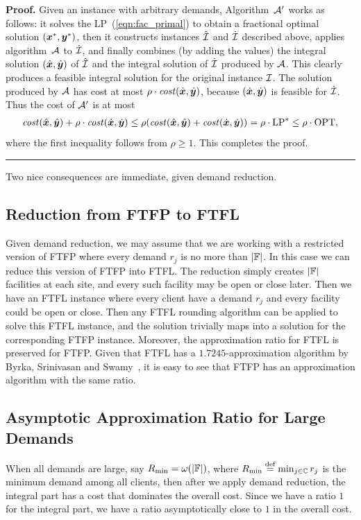 \documentclass[oneside,final]{ucr}
\newenvironment{proof}[1][Proof]{\textbf{#1.} }{\ \rule{0.5em}{0.5em}}
\begin{document}

\begin{proof}
  Given an {\FTFP} instance with arbitrary demands, Algorithm~$\calA'$ works
as follows: it solves the LP~(\ref{eqn:fac_primal}) to obtain a
  fractional optimal solution $(\boldsymbol{x}^\ast,\boldsymbol{y}^\ast)$, then it constructs
  instances $\hatcalI$ and $\dotcalI$ described above,  applies
  algorithm~$\calA$ to $\dotcalI$, and finally combines (by adding
  the values) the integral solution $(\hat{\boldsymbol{x}}, \hat{\boldsymbol{y}})$ of
  $\hatcalI$ and the integral solution of $\dotcalI$ produced
  by $\calA$. This clearly produces a feasible integral
  solution for the original instance $\mathcal{I}$.
The solution produced by $\calA$ has cost at most
$\rho\cdot{\it cost}(\dot{\boldsymbol{x}},\dot{\boldsymbol{y}})$, because $(\dot{\boldsymbol{x}},\dot{\boldsymbol{y}})$
is feasible for $\dotcalI$. Thus the cost of $\calA'$ is at most
% 
 \begin{align*}
 {\it cost}(\hat{\boldsymbol{x}}, \hat{\boldsymbol{y}}) + \rho\cdot{\it cost}(\dot{\boldsymbol{x}},\dot{\boldsymbol{y}})
	\le
 \rho({\it cost}(\hat{\boldsymbol{x}}, \hat{\boldsymbol{y}}) + {\it cost}(\dot{\boldsymbol{x}},\dot{\boldsymbol{y}}))
		= \rho\cdot\mbox{\rm LP}^\ast \le \rho\cdot\mbox{\rm OPT},
  \end{align*}
%
where the first inequality follows from $\rho\geq 1$. This completes
the proof.
\end{proof}

Two nice consequences are immediate, given demand reduction.
\subsection{Reduction from FTFP to FTFL}
Given demand reduction, we may assume that we are working
with a restricted version of FTFP where every demand $r_j$
is no more than $|\mathbb{F}|$. In this case we can reduce
this version of FTFP into FTFL. The reduction simply creates
$|\mathbb{F}|$ facilities at each site, and every such
facility may be open or close later. Then we have an FTFL
instance where every client have a demand $r_j$ and every
facility could be open or close. Then any FTFL rounding
algorithm can be applied to solve this FTFL instance, and
the solution trivially maps into a solution for the
corresponding FTFP instance. Moreover, the approximation
ratio for FTFL is preserved for FTFP. Given that FTFL has a
$1.7245$-approximation algorithm by Byrka, Srinivasan and
Swamy~\cite{ByrkaSS10}, it is easy to see that FTFP has an
approximation algorithm with the same ratio.

\subsection{Asymptotic Approximation Ratio for Large
  Demands}
When all demands are large, say $R_{\min} =
\omega(|\mathbb{F}|)$, where $R_{\min} \stackrel{\text{def}}{=}
\min_{j\in\mathbb{C}} r_j$ is the minimum demand among all
clients, then after we apply demand reduction, the integral
part has a cost that dominates the overall cost. Since we
have a ratio $1$ for the integral part, we have a ratio
asymptotically close to $1$ in the overall cost.
\end{document}

